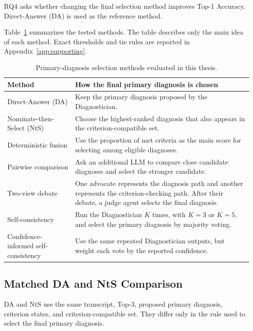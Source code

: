 \documentclass[12pt,a4paper,oneside]{report}
\begin{document}
RQ4 asks whether changing the final selection method improves Top-1
Accuracy. Direct-Answer (DA) is used as the reference method.

Table~\ref{tab:selection-method-provenance} summarizes the tested
methods. The table describes only the main idea of each method. Exact
thresholds and tie rules are reported in
Appendix~\ref{app:supporting}.

\begin{table}[htbp]
\centering
\caption{Primary-diagnosis selection methods evaluated in this thesis.}
\label{tab:selection-method-provenance}
\small
\renewcommand{\arraystretch}{1.12}
\begin{tabularx}{\textwidth}
{|>{\raggedright\arraybackslash}p{4.0cm}|
 >{\raggedright\arraybackslash}X|}
\hline
\textbf{Method} &
\textbf{How the final primary diagnosis is chosen}\\
\hline
Direct-Answer (DA) &
Keep the primary diagnosis proposed by the Diagnostician.\\
\hline
Nominate-then-Select (NtS) &
Choose the highest-ranked diagnosis that also appears in the
criterion-compatible set.\\
\hline
Deterministic fusion &
Use the proportion of met criteria as the main score for selecting
among eligible diagnoses.\\
\hline
Pairwise comparison &
Ask an additional LLM to compare close candidate diagnoses and select
the stronger candidate.\\
\hline
Two-view debate &
One advocate represents the diagnosis path and another represents the
criterion-checking path. After their debate, a judge agent selects the
final diagnosis.\\
\hline
Self-consistency &
Run the Diagnostician $K$ times, with $K=3$ or $K=5$, and select the
primary diagnosis by majority voting.\\
\hline
Confidence-informed self-consistency &
Use the same repeated Diagnostician outputs, but weight each vote by the
reported confidence.\\
\hline
\end{tabularx}
\renewcommand{\arraystretch}{1.0}
\end{table}

\subsection{Matched DA and NtS Comparison}

DA and NtS use the same transcript, Top-3, proposed primary diagnosis,
criterion states, and criterion-compatible set. They differ only in the
rule used to select the final primary diagnosis.
\end{document}
